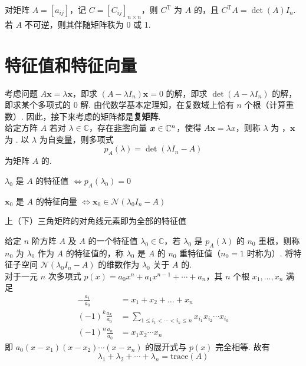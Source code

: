 \documentclass[./main.tex]{subfiles}
\begin{document}
对矩阵 $A=[a_{ij}]$，记 $C=[C_{ij}]_{n\times n}$，则 $C^{\mathrm{T}}$ 为 $A$ 的，且 $C^{\mathrm{T}}A=\det(A)I_n$. \\

若 $A$ 不可逆，则其伴随矩阵秩为 0 或 1.

\section{特征值和特征向量}

考虑问题 $A\bm{x}=\lambda\bm{x}$，即求 $(A-\lambda I_n)\bm{x}=0$ 的解，即求 $\det(A-\lambda I_n)$ 的解，即求某个多项式的 0 解. 由代数学基本定理知，在复数域上恰有 $n$ 个根（计算重数）. 因此，接下来考虑的矩阵都是\textbf{复矩阵}. \\

给定方阵 $A$ 若对 $\lambda\in\mathbb{C}$，存在\uline{非零}向量 $\bm{x}\in\mathbb{C}^{n}$，使得 $A\bm{x}=\lambda{x}$，则称 $\lambda$ 为 ，$\bm{x}$ 为 . 以 $\lambda$ 为自变量，则多项式
\begin{equation}
    p_A(\lambda)=\det(\lambda I_n-A)
\end{equation}
为矩阵 $A$ 的. \\

\begin{enumerate*}
    \item $\lambda_0$ 是 $A$ 的特征值 $\iff p_A(\lambda_0)=0$
    \item $\bm{x}_0$ 是 $A$ 的特征向量 $\iff \bm{x}_0\in\mathcal{N}(\lambda_0I_n-A)$
    \item 上（下）三角矩阵的对角线元素即为全部的特征值
\end{enumerate*}

给定 $n$ 阶方阵 $A$ 及 $A$ 的一个特征值 $\lambda_0\in\mathbb{C}$，若 $\lambda_0$ 是 $p_A(\lambda)$ 的 $n_0$ 重根，则称 $n_0$ 为 $\lambda_0$ 作为 $A$ 的特征值的，称 $\lambda_0$ 是 $A$ 的 $n_0$ 重特征值（$n_0=1$ 时称为）. 将特征子空间 $\mathcal{N}(\lambda_0 I_n-A)$ 的维数作为 $\lambda_0$ 关于 $A$ 的.\\

对于一元 $n$ 次多项式 $p(x)=a_0x^n+a_1x^{n-1}+\cdots+a_n$，其 $n$ 个根 $x_1,\dots,x_n$ 满足
\begin{align}
    -\frac{a_1}{a_0}        & =x_1+x_2+\dots+x_n                                           \\
    (-1)^k\frac{a_k}{a_0}   & =\sum_{1\le i_1<\cdots<i_k\le n}x_{i_1}x_{i_2}\cdots x_{i_k} \\
    (-1)^{n}\frac{a_n}{a_0} & =x_1x_2\cdots x_n
\end{align}
即 $a_0(x-x_1)(x-x_2)\cdots(x-x_n)$ 的展开式与 $p(x)$ 完全相等. 故有
\begin{equation}
    \lambda_1+\lambda_2+\cdots+\lambda_n=\mathrm{trace}(A)
\end{equation}
\end{document}

